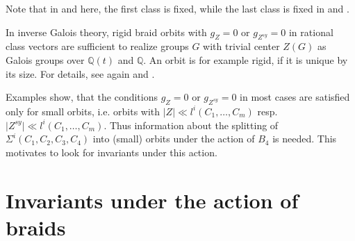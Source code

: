 \documentclass[12pt,a4paper]{article}
\numberwithin{equation}{section}
\numberwithin{table}{section}
\begin{document}
Note that in \cite{RefMat1989} and here, the first class is fixed, 
while the last class is fixed in \cite{RefMat1991} and \cite{RefMM2018}.
\par
\noindent
In inverse Galois theory, rigid braid orbits with $g_Z=0$ or $g_{Z^{sy}} = 0$ in rational class vectors are sufficient to
realize groups $G$ with trivial center $Z(G)$ as Galois groups over $\mathbb{Q}(t)$ and $\mathbb{Q}$. 
An orbit is for example rigid, if it is unique by its size. 
For details, see again \cite[III, 5]{RefMM2018} and \cite[III, 7]{RefMM2018}.
\par
\noindent
Examples show, that the conditions $g_Z=0$ or $g_{Z^{sy}} = 0$ in most cases are satisfied only for
small orbits, i.e. orbits with $ \vert Z \vert  \ll l^i(C_1,\dots, C_m)$ resp. $ \vert Z^{sy} \vert  \ll l^i(C_1,\dots, C_m)$.
Thus information about the splitting of $\Sigma^i(C_1,C_2,C_3,C_4)$ into (small) orbits under the action of $B_4$
is needed. This motivates to look for invariants under this action.

\section{Invariants under the action of braids}\label{SectionInvariantsUnderTheActionOfBraids}
\end{document}
